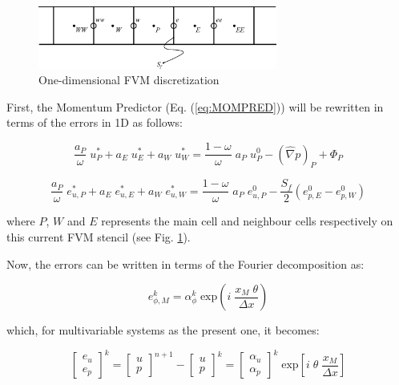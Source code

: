 \documentclass[final,3p,times,11pt,onecolumn]{myElsarticle}
\numberwithin{equation}{section}
\begin{document}
\begin{figure}[H]
    \centering
    \includegraphics[width=0.7\textwidth]{fig/cells.eps}
    \caption{One-dimensional FVM discretization}
    \label{fig:4a}
\end{figure}

First, the Momentum Predictor (Eq. (\ref{eq:MOMPRED})) will be rewritten in terms of the errors in 1D as follows:

\begin{equation}
    \dfrac{a_P}{\omega} \; u_P^* + a_E \; u_E^* + a_W \; u_W^* = \dfrac{1-\omega}{\omega} \; a_P \; u_P^0 - (\hat{\nabla} p)_P + \Phi_P
\end{equation}

\begin{equation}
    \dfrac{a_P}{\omega} \; e_{u,P}^* + a_E \; e_{u,E}^* + a_W \; e_{u,W}^* = \dfrac{1-\omega}{\omega} \; a_P \; e_{u,P}^0 - \dfrac{S_f}{2} (e^0_{p,E}-e^0_{p,W})
    \label{eq:MPerror}
\end{equation}

\noindent where $P$, $W$ and $E$ represents the main cell and neighbour cells respectively on this current FVM stencil (see Fig. \ref{fig:4a}).

Now, the errors can be written in terms of the Fourier decomposition as:

\begin{equation}
    e^k_{\phi,M} = \alpha^k_{\phi} \; \text{exp} \left(i \; \dfrac{x_M \; \theta}{\Delta x}\right)
    \label{eq:error}
\end{equation}

\noindent which, for multivariable systems as the present one, it becomes:

\begin{equation}
\begin{bmatrix}
e_u \\
e_p 
\end{bmatrix}^{k}
=
\begin{bmatrix}
u \\
p 
\end{bmatrix}^{n+1}
-\begin{bmatrix}
u \\
p 
\end{bmatrix}^{k}
=
\begin{bmatrix}
\alpha_u \\
\alpha_p 
\end{bmatrix}^{k}
\; \text{exp}\left[ i \; \theta \; \frac{x_M}{\Delta x}\right]
\label{eq:fou1}
\end{equation}
\end{document}
